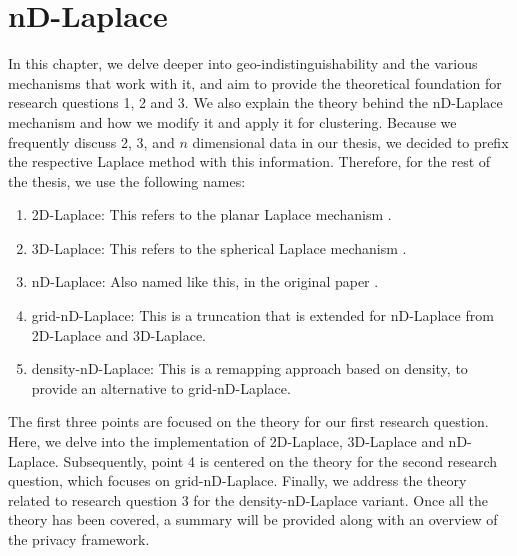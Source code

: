\chapter{nD-Laplace}
In this chapter, we delve deeper into geo-indistinguishability and the various mechanisms that work with it, and aim to provide the theoretical foundation for research questions 1, 2 and 3.
We also explain the theory behind the nD-Laplace mechanism and how we modify it and apply it for clustering.
Because we frequently discuss 2, 3, and $n$ dimensional data in our thesis, we decided to prefix the respective Laplace method with this information.
Therefore, for the rest of the thesis, we use the following names:
\begin{enumerate}
  \item 2D-Laplace: This refers to the planar Laplace mechanism \citep{DBLP:journals/corr/abs-1212-1984}.
  \item 3D-Laplace: This refers to the spherical Laplace mechanism \citep{9646489}.
  \item nD-Laplace: Also named like this, in the original paper \citep{fernandes_generalised_2019}.
  \item grid-nD-Laplace: This is a truncation that is extended for nD-Laplace from 2D-Laplace and 3D-Laplace.
  \item density-nD-Laplace: This is a remapping approach based on density, to provide an alternative to grid-nD-Laplace.
\end{enumerate}
The first three points are focused on the theory for our first research question. Here, we delve into the implementation of 2D-Laplace, 3D-Laplace and nD-Laplace. Subsequently, point 4 is centered on the theory for the second research question, which focuses on grid-nD-Laplace. Finally, we address the theory related to research question 3 for the density-nD-Laplace variant. Once all the theory has been covered, a summary will be provided along with an overview of the privacy framework.



\newpage
